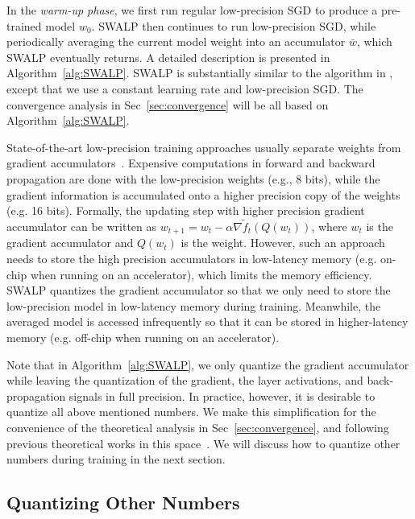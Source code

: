 \documentclass{article}
\begin{document}
In the \emph{warm-up phase}, we first run regular low-precision SGD to produce a pre-trained model $w_0$.
SWALP then continues to run low-precision SGD, while periodically averaging the current model weight into an accumulator $\bar{w}$, which SWALP eventually returns.
A detailed description is presented in Algorithm~\ref{alg:SWALP}.
SWALP is substantially similar to the algorithm in \citet{SWA}, except that we use a constant learning rate and low-precision SGD.
The convergence analysis in Sec~\ref{sec:convergence} will be all based on Algorithm~\ref{alg:SWALP}.

State-of-the-art low-precision training approaches usually separate weights from gradient accumulators~\cite{binaryconnect, dorefa-net, WAGE, 8bitfloat}.
Expensive computations in forward and backward propagation are done with the low-precision weights (e.g., 8 bits), while the gradient information is accumulated onto a higher precision copy of the weights (e.g. 16 bits).
Formally, the updating step with higher precision gradient accumulator can be written as $w_{t+1} = w_{t} - \alpha \nabla\tilde{f}_t(Q(w_t))$, where $w_{t}$ is the gradient accumulator and $Q(w_t)$ is the weight.
However, such an approach needs to store the high precision accumulators in low-latency memory (e.g. on-chip when running on an accelerator), which limits the memory efficiency.
SWALP quantizes the gradient accumulator so that we only need to store the low-precision model in low-latency memory during training. Meanwhile, the averaged model is accessed infrequently so that it can be stored in higher-latency memory (e.g. off-chip when running on an accelerator). 

Note that in Algorithm~\ref{alg:SWALP}, we only quantize the gradient accumulator while leaving the quantization of the gradient, the layer activations, and back-propagation signals in full precision.
In practice, however, it is desirable to quantize all above mentioned numbers.
We make this simplification for the convenience of the theoretical analysis in Sec~\ref{sec:convergence}, and following previous theoretical works in this space~\cite{training-quantized-network-deeper-understanding,HALP}.
We will discuss how to quantize other numbers during training in the next section.

\subsection{Quantizing Other Numbers}\label{sec:method-quant-all}
\end{document}
